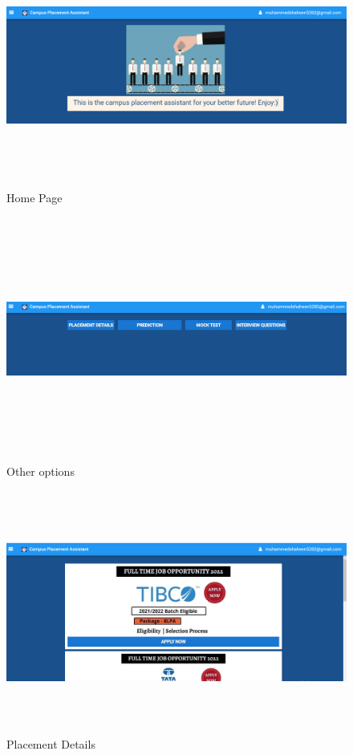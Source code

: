 \documentclass[12pt]{article}
\begin{document}
\begin{figure}[H]
\begin{center}
 \includegraphics[width=16cm, height=8cm]{Screenshot3}
\caption{Home Page }
\end{center}
\end{figure}

\begin{figure}[H]
\begin{center}
 \includegraphics[width=16cm, height=8cm]{Screenshot4}
\caption{Other options}
\end{center}
\end{figure}

\begin{figure}[H]
\begin{center}
 \includegraphics[width=16cm, height=8cm]{Screenshot5}
\caption{Placement Details}
\end{center}
\end{figure}
\end{document}
